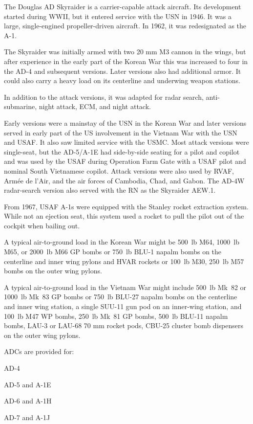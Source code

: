 
The Douglas AD Skyraider is a carrier-capable attack aircraft. Its development started during WWII, but it entered service with the USN in 1946. It was a large, single-engined propeller-driven aircraft. In 1962, it was redesignated as the A-1.

The Skyraider was initially armed with two 20 mm M3 cannon in the wings, but after experience in the early part of the Korean War this was increased to four in the AD-4 and subsequent versions. Later versions also had additional armor. It could also carry a heavy load on its centerline and underwing weapon stations.

In addition to the attack versions, it was adapted for radar search, anti-submarine, night attack, ECM, and night attack.

Early versions were a mainstay of the USN in the Korean War and later versions served in early part of the US involvement in the Vietnam War with the USN and USAF. It also saw limited service with the USMC. Most attack versions were single-seat, but the AD-5/A-1E had side-by-side seating for a pilot and copilot and was used by the USAF during Operation Farm Gate with a USAF pilot and nominal South Vietnamese copilot. Attack versions were also used by RVAF, Armée de l'Air, and the air forces of Cambodia, Chad, and Gabon. The AD-4W radar-search version also served with the RN as the Skyraider AEW.1.

From 1967, USAF A-1s were equipped with the Stanley rocket extraction system. While not an ejection seat, this system used a rocket to pull the pilot out of the cockpit when bailing out.

A typical air-to-ground load in the Korean War might be 500~lb M64, 1000~lb M65, or 2000~lb M66 GP bombs or 750~lb BLU-1 napalm bombs on the centerline and inner wing pylons and HVAR rockets or 100~lb M30, 250~lb M57 bombs on the outer wing pylons.

A typical air-to-ground load in the Vietnam War might include 500~lb Mk~82 or 1000~lb Mk~83 GP bombs or 750~lb BLU-27 napalm bombs on the centerline and inner wing station, a single SUU-11 gun pod on an inner-wing station, and 100~lb M47 WP bombs, 250~lb Mk~81 GP bombs, 500~lb BLU-11 napalm bombs, LAU-3 or LAU-68 70 mm rocket pods, CBU-25 cluster bomb dispensers on the outer wing pylons.

ADCs are provided for:
\begin{adclist}
    \item AD-4
    \item AD-5 and A-1E
    \item AD-6 and A-1H
    \item AD-7 and A-1J
\end{adclist}
